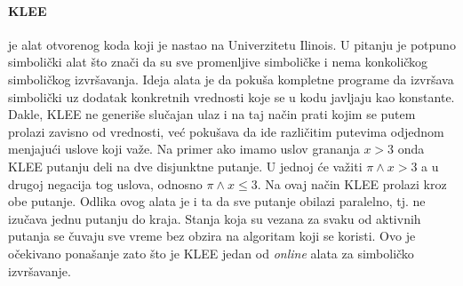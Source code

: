 \documentclass[12pt,oneside]{memoir}
\begin{document}
\paragraph{KLEE}\cite{klee} je alat otvorenog koda koji je nastao na Univerzitetu Ilinois. U pitanju je potpuno simbolički alat što znači da su sve promenljive simboličke i nema konkoličkog simboličkog izvršavanja. Ideja alata je da pokuša kompletne programe da izvršava simbolički uz dodatak konkretnih vrednosti koje se u kodu javljaju kao konstante. Dakle, KLEE ne generiše slučajan ulaz i na taj način prati kojim se putem prolazi zavisno od vrednosti, već pokušava da ide različitim putevima odjednom menjajući uslove koji važe. Na primer ako imamo uslov grananja $x > 3$ onda KLEE putanju deli na dve disjunktne putanje. U jednoj će važiti $\pi \land x > 3$ a u drugoj negacija tog uslova, odnosno $\pi \land x \leq 3$. Na ovaj način KLEE prolazi kroz obe putanje. Odlika ovog alata je i ta da sve putanje obilazi paralelno, tj. ne izučava jednu putanju do kraja. Stanja koja su vezana za svaku od aktivnih putanja se čuvaju sve vreme bez obzira na algoritam koji se koristi. Ovo je očekivano ponašanje zato što je KLEE jedan od \textit{online} alata za simboličko izvršavanje.
\end{document}
